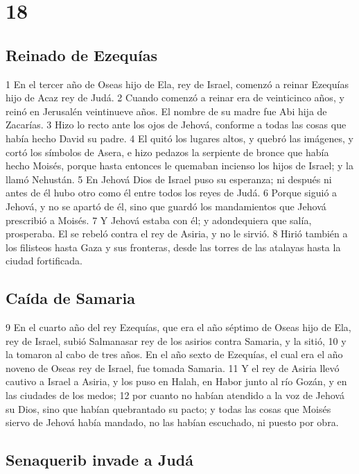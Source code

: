 \chapter{18}

\section*{Reinado de Ezequías}

 

1 En el tercer año de Oseas hijo de Ela, rey de Israel, comenzó a reinar Ezequías hijo de Acaz rey de Judá.
2 Cuando comenzó a reinar era de veinticinco años, y reinó en Jerusalén veintinueve años. El nombre de su madre fue Abi hija de Zacarías.
3 Hizo lo recto ante los ojos de Jehová, conforme a todas las cosas que había hecho David su padre.
4 El quitó los lugares altos, y quebró las imágenes, y cortó los símbolos de Asera, e hizo pedazos la serpiente de bronce que había hecho Moisés, porque hasta entonces le quemaban incienso los hijos de Israel; y la llamó Nehustán.
5 En Jehová Dios de Israel puso su esperanza; ni después ni antes de él hubo otro como él entre todos los reyes de Judá. 
6 Porque siguió a Jehová, y no se apartó de él, sino que guardó los mandamientos que Jehová prescribió a Moisés.
7 Y Jehová estaba con él; y adondequiera que salía, prosperaba. El se rebeló contra el rey de Asiria, y no le sirvió.
8 Hirió también a los filisteos hasta Gaza y sus fronteras, desde las torres de las atalayas hasta la ciudad fortificada.
\section*{Caída de Samaria}

9 En el cuarto año del rey Ezequías, que era el año séptimo de Oseas hijo de Ela, rey de Israel, subió Salmanasar rey de los asirios contra Samaria, y la sitió,
10 y la tomaron al cabo de tres años. En el año sexto de Ezequías, el cual era el año noveno de Oseas rey de Israel, fue tomada Samaria.
11 Y el rey de Asiria llevó cautivo a Israel a Asiria, y los puso en Halah, en Habor junto al río Gozán, y en las ciudades de los medos;
12 por cuanto no habían atendido a la voz de Jehová su Dios, sino que habían quebrantado su pacto; y todas las cosas que Moisés siervo de Jehová había mandado, no las habían escuchado, ni puesto por obra.
\section*{Senaquerib invade a Judá}

